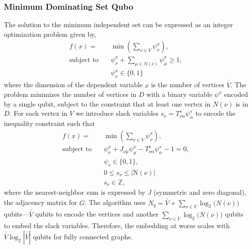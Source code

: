 \documentclass[prd,twocolumn,tightenlines,preprintnumbers,showpacs,superscriptaddress,notitlepage,nofootinbib,eqsecnum,floatfix,longbibliography,aps,10pt]{revtex4-2}
\begin{document}
\subsubsection{Minimum Dominating Set Qubo}
\label{sec:methods:mds-qubo}

The solution to the minimum independent set can be expressed as an integer optimization problem given by,
\begin{align}
 f(x) =                    & \min\left(\sum_{\nu \in V} \psi^x_{\nu}\right),                    \\
 \textrm{subject to} \quad & \psi^x_{\nu} + \sum_{\mu \in \mathit{N}(\nu)} \psi^x_{\mu} \geq 1, \\
                           & \psi^x_{\nu} \in \{0, 1\}
\end{align}
where the dimension of the dependent variable $x$ is the number of vertices $\overline{\overline{V}}$.
The problem minimizes the number of vertices in $D$ with a binary variable $\psi^x$ encoded by a single qubit, subject to the constraint that at least one vertex in $\mathit{N}(\nu)$ is in $D$.
For each vertex in $V$ we introduce slack variables $s_{\nu} = T^s_{\nu \alpha} \psi^s_{\alpha}$ to encode the inequality constraint such that
\begin{align}
 f(x) =                    & \min(\sum_{\nu\in V} \psi^x_{\nu}),                                                 \\
 \textrm{subject to} \quad & \psi^x_{\nu} + J_{\nu \mu} \psi^x_{\mu}- T^s_{\nu \alpha} \psi^s_{\alpha}  - 1 = 0, \\
                           & \psi_{\nu} \in \{0, 1\},                                                            \\
                           & 0 \leq s_{\nu} \leq |\mathrm{N}(\nu)|                                               \\
                           & s_{\nu} \in \mathbb{Z},
\end{align}
where the nearest-neighbor sum is expressed by $J$ (symmetric and zero diagonal), the adjacency matrix for $G$.
The algorithm uses $N_q = \overline{\overline{V}} + \sum_{\nu \in V} \log_2 \mathit(N(\nu))$ qubits---$\overline{\overline{V}}$ qubits to encode the vertices and another $\sum_{\nu \in V} \log_2 \mathit(N(\nu))$ qubits to embed the slack variables.
Therefore, the embedding at worse scales with $\overline{\overline{V}} \log_2 |\overline{\overline{V}}|$ qubits for fully connected graphs.
\end{document}
